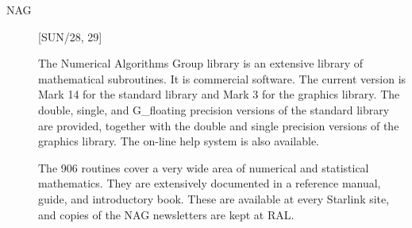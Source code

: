 \begin{description}

\item [NAG] \hfill [SUN/28, 29]

The Numerical Algorithms Group library is an extensive library of mathematical
subroutines.
It is commercial software.
The current version is Mark 14 for the standard library and Mark 3 for the
graphics library.
The double, single, and G\_floating precision versions of the standard library
are provided, together with the double and single precision versions of the
graphics library. 
The on-line help system is also available.

The 906 routines cover a very wide area of numerical and statistical
mathematics.
They are extensively documented in a reference manual, guide, and introductory
book.
These are available at every Starlink site, and copies of the NAG newsletters
are kept at RAL.


\end{description}
